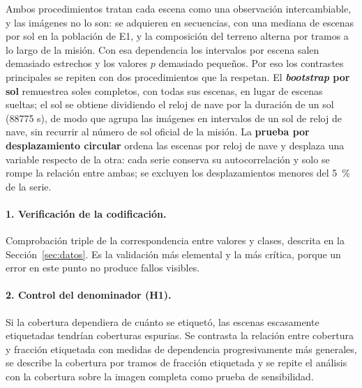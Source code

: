 Ambos procedimientos tratan cada escena como una observación intercambiable, y las imágenes no
lo son: se adquieren en secuencias, con una mediana de \cTempEscSolEUno{} escenas por sol en la
población de E1, y la composición del terreno alterna por tramos a lo largo de la misión. Con esa
dependencia los intervalos por escena salen demasiado estrechos y los valores $p$ demasiado
pequeños. Por eso los contrastes principales se repiten con dos procedimientos que la respetan.
El \textbf{\textit{bootstrap} por sol} remuestrea soles completos, con todas sus escenas, en
lugar de escenas sueltas; el sol se obtiene dividiendo el reloj de nave por la duración de un sol
(\num{88775} s), de modo que agrupa las imágenes en intervalos de un sol de reloj de nave, sin
recurrir al número de sol oficial de la misión. La \textbf{prueba por desplazamiento circular} ordena las escenas por
reloj de nave y desplaza una variable respecto de la otra: cada serie conserva su
autocorrelación y solo se rompe la relación entre ambas; se excluyen los desplazamientos
menores del \SI{5}{\percent} de la serie.

\paragraph{1. Verificación de la codificación.} Comprobación triple de la correspondencia entre
valores y clases, descrita en la Sección~\ref{sec:datos}. Es la validación más elemental y la
más crítica, porque un error en este punto no produce fallos visibles.

\paragraph{2. Control del denominador (H1).} Si la cobertura dependiera de cuánto se etiquetó,
las escenas escasamente etiquetadas tendrían coberturas espurias. Se contrasta la relación entre
cobertura y fracción etiquetada con medidas de dependencia progresivamente más generales, se
describe la cobertura por tramos de fracción etiquetada y se repite el análisis con la cobertura
sobre la imagen completa como prueba de sensibilidad.

